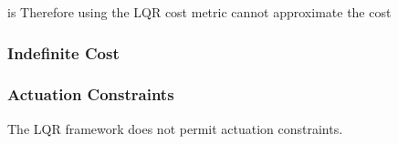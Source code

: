 \documentclass[letterpaper, 10pt, english, conference]{IEEEtran}
\begin{document}
is Therefore using the LQR cost metric cannot approximate the cost 

\begin{comment}
Typical RTT{*} the cost metric is an underestimate of the true cost,
since the metric does not take into consideration obstacles. The true
cost, for example, might be infinite if there is no feasible path,
but the Euclidian metric will always be finite.

If the system is uncontrollable as is linearized by a single point,
then the LQR cost will be infinite while the true cost is not.
\end{comment}



\subsubsection{Indefinite Cost}

\begin{comment}
What if $\hat{Q}$ is indefinite? 

Options:

1. Use sequential QP techniques like shifting eigenvalues to make
$\hat{Q}$ definite. 

http://www.cs.berkeley.edu/\textasciitilde{}pabbeel/cs287-fa11/slides/NonlinearOptimizationForOptimalControl.pdf
(Page 11 bottom slide)

2. LQR with indefnite weighting matrices

Chapter 9 of:

http://epubs.siam.org.libproxy.mit.edu/doi/book/10.1137/1.9781611970760

(same book) 

http://books.google.com/books?id=bD\_83idGZ2cC\&lpg=PA211\&ots=q3U7u4rmNc\&dq=indefinite\%20LQR\&pg=PA211\#v=onepage\&q\&f=false

http://www.tandfonline.com/doi/abs/10.1080/00207178408933184\#preview
\end{comment}



\subsubsection{Actuation Constraints}

The LQR framework does not permit actuation constraints.

\begin{comment}
Say the LQR solution returns a control action $u\not\in\mathcal{U}$
(the set of permitted actions). Simply choosing a $u'=\alpha u$ such
that $u'\in\mathcal{U}$ while minimizing $\alpha^{2}$ (so that $u'$
is close to $u$) intuitively will not explore the space as desired
-- the state won't move along the same direction in general.

To clarify:

if the state of the system is $x_{k}$, then the next state is $x_{k+1}=Ax_{k}+Bu$,
which presumably moves the system toward $x_{rand}$. The state $x_{k+1}'=Ax_{k}+Bu'$
does not, in general, move the system directly toward $x_{rand}$.
\end{comment}
\end{document}
